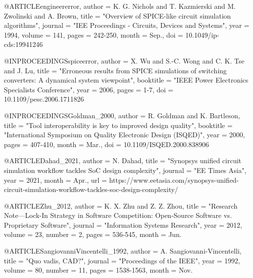\documentclass[conference]{IEEEtran}
\begin{document}
@ARTICLE{engineererror,
    author      =   {K. G. {Nichols} and T. {Kazmierski} and M. {Zwolinski} and A. {Brown}},
    title       =   "{Overview of {SPICE}-like circuit simulation algorithms}",
    journal     =   "{IEE Proceedings - Circuits, Devices and Systems}",
    year        =   {1994},
    volume      =   {141},
    pages       =   {242-250},
    month       =   {Sep.},
    doi         =   {10.1049/ip-cds:19941246}
}

@INPROCEEDINGS{spiceerror,
    author      =   {X. {Wu} and S.-C. {Wong} and C. K. {Tse} and J. {Lu}},
    title       =   "{Erroneous results from {SPICE} simulations of switching converters: A dynamical system viewpoint}",
    booktitle   =   "{IEEE Power Electronics Specialists Conference}",
    year        =   {2006},
    pages       =   {1-7},
    doi         =   {10.1109/pesc.2006.1711826}
}

@INPROCEEDINGS{Goldman_2000,
    author      =   {R. {Goldman} and K. {Bartleson}},
    title       =   "{Tool interoperability is key to improved design quality}",
    booktitle   =   "{International Symposium on Quality Electronic Design (ISQED)}",
    year        =   {2000},
    pages       =   {407-410},
    month       =   {Mar.},
    doi         =   {10.1109/ISQED.2000.838906}
}

@ARTICLE{Dahad_2021,
    author      =   {N. {Dahad}},
    title       =   "{Synopsys unified circuit simulation workflow tackles {SoC} design complexity}",
    journal     =   "{EE Times Asia}",
    year        =   {2021},
    month       =   {Apr.},
    url         =   {https://www.eetasia.com/synopsys-unified-circuit-simulation-workflow-tackles-soc-design-complexity/}
}

@ARTICLE{Zhu_2012,
    author      =   {K. X. {Zhu} and Z. Z. {Zhou}},
    title       =   "{Research Note---Lock-In Strategy in Software Competition: Open-Source Software vs. Proprietary Software}",
    journal     =   "{Information Systems Research}",
    year        =   {2012},
    volume      =   {23},
    number      =   {2},
    pages       =   {536-545},
    month       =   {Jun.}
}

@ARTICLE{SangiovanniVincentelli_1992,
    author      =   {A. {Sangiovanni-Vincentelli}},
    title       =   "{Quo vadis, {CAD}?}",
    journal     =   "{Proceedings of the IEEE}",
    year        =   {1992},
    volume      =   {80},
    number      =   {11},
    pages       =   {1538-1563},
    month       =   {Nov.}
}

\end{document}
